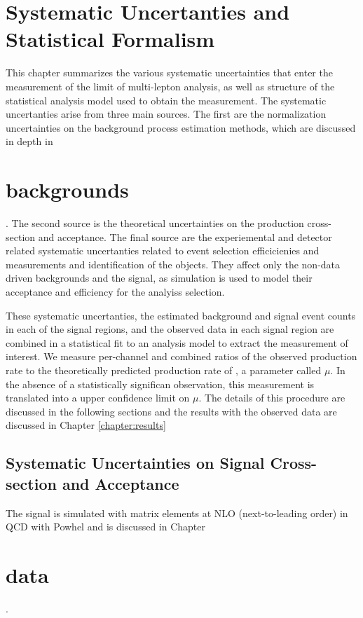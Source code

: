 \chapter[Systematic Uncertanties and Statistical Formalism][Systematic Uncertainties and Statistical Formalism]{Systematic Uncertanties and Statistical Formalism}
\label{chapter:systematics} 

This chapter summarizes the various systematic uncertainties that enter the measurement of the limit of \tth multi-lepton analysis, as well as structure of the statistical 
analysis model used to obtain the measurement. The systematic uncertanties arise
from three main sources. The first are the normalization uncertainties on the background process estimation methods, which are discussed in depth in \chapter{backgrounds}. 
The second source is the theoretical uncertainties on the \tth production cross-section and acceptance. The final source are the experiemental and detector related systematic
uncertanties related to event selection efficicienies and measurements and identification of the objects. They affect only the non-data driven backgrounds and the \tth
signal, as simulation is used to model their acceptance and efficiency for the analyiss selection. 

These systematic uncertanties, the estimated background and signal event counts in each of the signal regions, and the observed data in each signal region are combined
in a statistical fit to an analysis model to extract the measurement of interest. We measure per-channel and combined ratios of the observed production rate to the 
theoretically predicted production rate of \tth, a parameter called $\mu$. In the absence of a statistically significan observation, this measurement is translated into a upper confidence limit
on $\mu$. The details of this procedure are discussed in the following sections and the results with the observed data are discussed in Chapter \ref{chapter:results}

\section{Systematic Uncertainties on Signal Cross-section and Acceptance}

The \ttH signal is simulated with matrix elements at NLO (next-to-leading order) in QCD with {\sc Powhel} and is discussed in Chapter \chapter{data}.  

